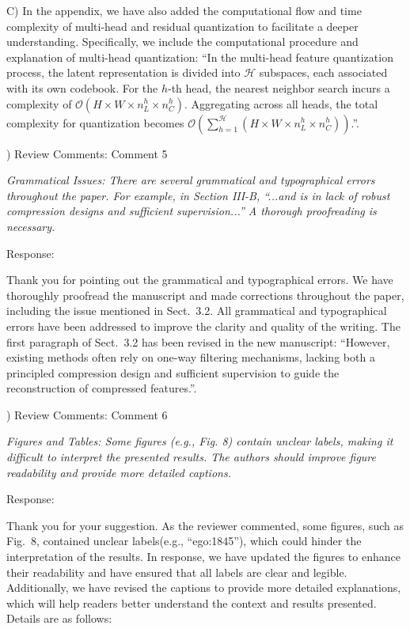 \documentclass[12pt,a4paper]{article}
\begin{document}
C) In the appendix, we have also added the computational flow and time complexity of multi-head and residual quantization to facilitate a deeper understanding. Specifically, we include the computational procedure and explanation of multi-head quantization: ``In the multi-head feature quantization process, the latent representation is divided into $\mathcal{H}$ subspaces, each associated with its own codebook. For the $h$-th head, the nearest neighbor search incurs a complexity of $\mathcal{O}(H\times W\times n_L^h\times n_C^h)$. Aggregating across all heads, the total complexity for quantization becomes $\mathcal{O}(\sum_{h=1}^{\mathcal{H}}(H\times W\times n_L^h\times n_C^h))$.''.

\vspace{4ex}
) Review Comments: Comment 5

\textit{Grammatical Issues: There are several grammatical and typographical errors throughout the paper. For example, in Section III-B, ``...and is in lack of robust compression designs and sufficient supervision...'' A thorough proofreading is necessary.}

\noindent Response:

Thank you for pointing out the grammatical and typographical errors. We have thoroughly proofread the manuscript and made corrections throughout the paper, including the issue mentioned in Sect.~3.2. All grammatical and typographical errors have been addressed to improve the clarity and quality of the writing. The first paragraph of Sect.~3.2 has been revised in the new manuscript: ``However, existing methods often rely on one-way filtering mechanisms, lacking both a principled compression design and sufficient supervision to guide the reconstruction of compressed features.''.

\vspace{4ex}
) Review Comments: Comment 6

\textit{Figures and Tables: Some figures (e.g., Fig. 8) contain unclear labels, making it difficult to interpret the presented results. The authors should improve figure readability and provide more detailed captions.}

\noindent Response:

Thank you for your suggestion. As the reviewer commented,  some figures, such as Fig.~8, contained unclear labels(e.g., ``ego:1845''), which could hinder the interpretation of the results. In response, we have updated the figures to enhance their readability and have ensured that all labels are clear and legible. Additionally, we have revised the captions to provide more detailed explanations, which will help readers better understand the context and results presented.
Details are as follows:
\end{document}
